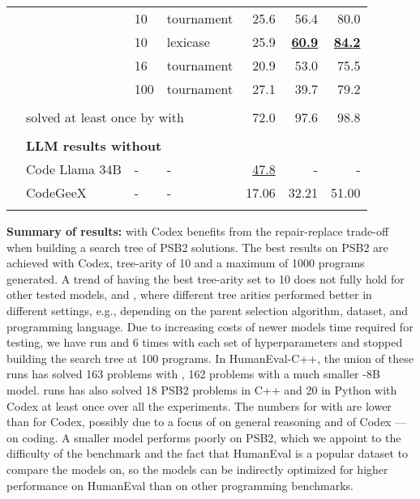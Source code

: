 \begin{table}[t]
\begin{adjustbox}{max width=\textwidth}
\begin{DIFnomarkup}
\begin{tabular}{llllrrr}
       &        & 10  &         tournament &    25.6 &     56.4 &      80.0 \\
       &        & 10  &           lexicase &    25.9 &     \underline{\textbf{60.9}} &      \underline{\textbf{84.2}} \\
       &        & 16  &         tournament &    20.9 &     53.0 &      75.5 \\
       &        & 100 &         tournament &    27.1 &     39.7 &      79.2 \\[1pt]
\cline{3-7}\\[-8pt]
       & \multicolumn{3}{l}{solved at least once by \method{} with \llama{}} & 72.0 &     97.6 &      98.8  \\[1pt]
\cline{2-7}\\[-8pt]
& \multicolumn{6}{l}{\textbf{LLM results without \method{}}} \\
& Code Llama 34B & - &  - &  \underline{47.8}  &  -   &    - \\
& CodeGeeX & - &  - &  17.06  &  32.21   &    51.00 \\[-2pt]
\bottomrule
\vspace{-4.4ex}
\end{tabular}
\end{DIFnomarkup} %
\end{adjustbox}
\end{table}

\begin{framed}
\textbf{Summary of \method{} results:} 
\method{} with Codex benefits from the repair-replace trade-off when building a search tree of PSB2 solutions. The best results on PSB2 are achieved with Codex, tree-arity of 10 and a maximum of 1000 programs generated. A trend of having the best tree-arity set to 10 does not fully hold for other tested models, \gpt{} and \llama{}, where different tree arities performed better in different settings, e.g., depending on the parent selection algorithm, dataset, and programming language. 
Due to increasing costs of newer models time required for testing, we have run \gpt{} and \llama{} 6 times with each set of hyperparameters and stopped building the search tree at 100 programs. 
In HumanEval-C++, the union of these runs has solved 163 problems with \gpt{}, 162 problems with a much smaller \llama{}-8B model.
\method{} runs has also solved 18 PSB2 problems in C++ and 20 in Python with Codex at least once over all the experiments. 
The numbers for \method{} with \gpt{} are lower than for Codex, possibly due to a focus of \gpt{} on general reasoning and of Codex --- on coding.
A smaller \llama{} model performs poorly on PSB2, which we appoint to the difficulty of the benchmark and the fact that HumanEval is a popular dataset to compare the models on, so the models can be indirectly optimized for higher performance on HumanEval than on other programming benchmarks.
\end{framed}


